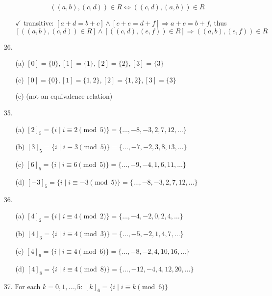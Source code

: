 \documentclass{article}
\begin{document}
\begin{enumerate}
\begin{itemize}
            \[
            ((a,b), (c,d)) \in R \Leftrightarrow ((c,d),(a,b)) \in R
            \]
            \item[$\checkmark$] transitive: $[a+d = b+c] \land [c+e = d+f] \Rightarrow a+e = b+f$, thus
            \[
            [((a,b),(c,d)) \in R] \land [((c,d),(e,f)) \in R] \Rightarrow ((a,b),(e,f)) \in R
            \]
        \end{itemize}
    \item[26.]
        \begin{itemize}
            \item[(a)] $[0] = \{ 0 \}, [1] = \{ 1 \}, [2] = \{ 2 \}, [3] = \{ 3 \}$
            \item[(c)] $[0] = \{ 0 \}, [1] = \{ 1, 2 \}, [2] = \{ 1, 2 \}, [3] = \{ 3 \}$
            \item[(e)] (not an equivalence relation)
        \end{itemize}
    \item[35.]
        \begin{itemize}
            \item[(a)] $[2]_{5} = \{ i \mid i \equiv 2 \pmod 5 \} = \{ \ldots, -8, -3, 2, 7, 12, \ldots \}$
            \item[(b)] $[3]_{5} = \{ i \mid i \equiv 3 \pmod 5 \} = \{ \ldots, -7, -2, 3, 8, 13, \ldots \}$
            \item[(c)] $[6]_{5} = \{ i \mid i \equiv 6 \pmod 5 \} = \{ \ldots, -9, -4, 1, 6, 11, \ldots \}$
            \item[(d)] $[-3]_{5} = \{ i \mid i \equiv -3 \pmod 5 \} = \{ \ldots, -8, -3, 2, 7, 12, \ldots \}$
        \end{itemize}
    \item[36.]
        \begin{itemize}
            \item[(a)] $[4]_{2} = \{ i \mid i \equiv 4 \pmod 2 \} = \{ \ldots, -4, -2, 0, 2, 4, \ldots \}$
            \item[(b)] $[4]_{3} = \{ i \mid i \equiv 4 \pmod 3 \} = \{ \ldots, -5, -2, 1, 4, 7, \ldots \}$
            \item[(c)] $[4]_{6} = \{ i \mid i \equiv 4 \pmod 6 \} = \{ \ldots, -8, -2, 4, 10, 16, \ldots \}$
            \item[(d)] $[4]_{8} = \{ i \mid i \equiv 4 \pmod 8 \} = \{ \ldots, -12, -4, 4, 12, 20, \ldots \}$
        \end{itemize}
    \item[37.] For each $k = 0, 1, \ldots, 5$: $[k]_{6} = \{ i \mid i \equiv k \pmod 6 \}$

\end{enumerate}
\end{document}
